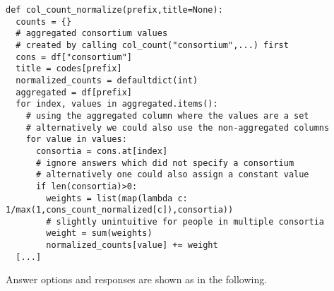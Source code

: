 \documentclass[headsepline,titlepage,twoside,12pt,toc=flat,headings=normal]{scrreprt}
\begin{document}
\begin{lstlisting}
def col_count_normalize(prefix,title=None):
  counts = {}
  # aggregated consortium values
  # created by calling col_count("consortium",...) first
  cons = df["consortium"]
  title = codes[prefix]
  normalized_counts = defaultdict(int)
  aggregated = df[prefix]
  for index, values in aggregated.items():
    # using the aggregated column where the values are a set
    # alternatively we could also use the non-aggregated columns
    for value in values:
      consortia = cons.at[index]
      # ignore answers which did not specify a consortium
      # alternatively one could also assign a constant value
      if len(consortia)>0:
        weights = list(map(lambda c: 1/max(1,cons_count_normalized[c]),consortia))
        # slightly unintuitive for people in multiple consortia
        weight = sum(weights)
        normalized_counts[value] += weight
  [...]
\end{lstlisting}

\iffalse
Each given question $q$ out of the set of multiple choice questions $Q$ is assigned a set of possible answers $A_q$.
Each individual respondent $r$ of the 51 respondents $R$ now selects a subset $A_{q_r} \subseteq A_q$ of the answers for that question.
Base answer counts $c_a$ for each answer $a \in A_q$ are intuitively determined as:

\[ c_a = |\{r \in R: a \in A_{q_r} \}| \].

For example, 2 of the 51 respondents chose \emph{Data Steward} as one of their roles, see  \cref{fig:role} and \cref{tab:results}.
However 
see \cref{fig:role_n}

Normalized counts are determined as:

\[ c{_a}' = \sum_{r \in R: a \in A_{q_r}}{\frac{1}{\mathrm{g}(r)}} \]

where $\mathrm{g}(r)$ is the number of consortia that r belongs to.

\fi

\noindent Answer options and responses are shown as in the following.

\end{document}
